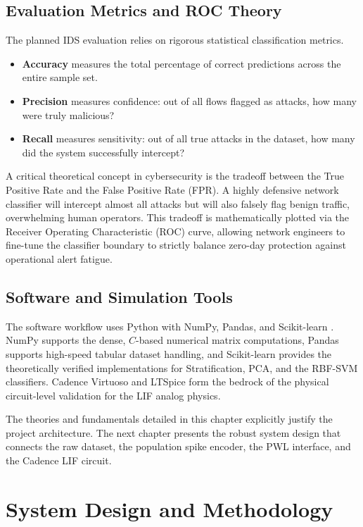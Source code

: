 \documentclass{ieeeaccess}
\begin{document}
\subsection{Evaluation Metrics and ROC Theory}

The planned IDS evaluation relies on rigorous statistical classification metrics. 
\begin{itemize}
\item \textbf{Accuracy} measures the total percentage of correct predictions across the entire sample set.
\item \textbf{Precision} measures confidence: out of all flows flagged as attacks, how many were truly malicious?
\item \textbf{Recall} measures sensitivity: out of all true attacks in the dataset, how many did the system successfully intercept?
\end{itemize}

A critical theoretical concept in cybersecurity is the tradeoff between the True Positive Rate and the False Positive Rate (FPR). A highly defensive network classifier will intercept almost all attacks but will also falsely flag benign traffic, overwhelming human operators. This tradeoff is mathematically plotted via the Receiver Operating Characteristic (ROC) curve, allowing network engineers to fine-tune the classifier boundary to strictly balance zero-day protection against operational alert fatigue.

\subsection{Software and Simulation Tools}

The software workflow uses Python with NumPy, Pandas, and Scikit-learn \cite{Pedregosa2011}. NumPy supports the dense, $C$-based numerical matrix computations, Pandas supports high-speed tabular dataset handling, and Scikit-learn provides the theoretically verified implementations for Stratification, PCA, and the RBF-SVM classifiers. Cadence Virtuoso and LTSpice form the bedrock of the physical circuit-level validation for the LIF analog physics.

The theories and fundamentals detailed in this chapter explicitly justify the project architecture. The next chapter presents the robust system design that connects the raw dataset, the population spike encoder, the PWL interface, and the Cadence LIF circuit.


\section{System Design and Methodology}
\end{document}

